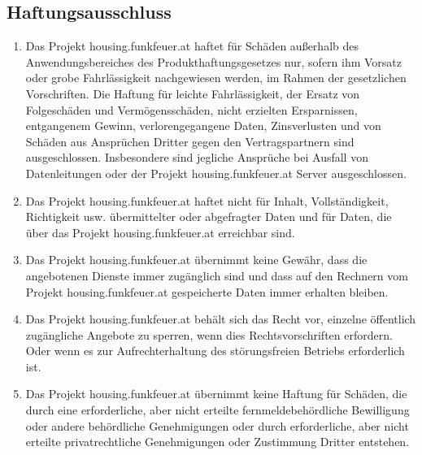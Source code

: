 \documentclass[parskip=half]{article}
\begin{document}
\subsection{ Haftungsausschluss}
\begin{enumerate}
\item Das Projekt housing.funkfeuer.at haftet für Schäden außerhalb des
Anwendungsbereiches des Produkthaftungsgesetzes nur, sofern ihm Vorsatz oder grobe
Fahrlässigkeit nachgewiesen werden, im Rahmen der gesetzlichen Vorschriften. Die
Haftung für leichte Fahrlässigkeit, der Ersatz von Folgeschäden und Vermögensschäden, nicht erzielten Ersparnissen, entgangenem Gewinn, verlorengegangene Daten, Zinsverlusten und
von Schäden aus Ansprüchen Dritter gegen den Vertragspartnern sind ausgeschlossen. Insbesondere sind jegliche Ansprüche bei Ausfall von Datenleitungen oder der Projekt housing.funkfeuer.at Server ausgeschlossen.
\item Das Projekt housing.funkfeuer.at haftet nicht für Inhalt, Vollständigkeit, Richtigkeit usw.
übermittelter oder abgefragter Daten und für Daten, die über das Projekt
housing.funkfeuer.at erreichbar sind.
\item Das Projekt housing.funkfeuer.at übernimmt keine Gewähr, dass die angebotenen
Dienste immer zugänglich sind und dass auf den Rechnern vom Projekt
housing.funkfeuer.at gespeicherte Daten immer erhalten bleiben.
\item Das Projekt housing.funkfeuer.at behält sich das Recht vor, einzelne öffentlich
zugängliche Angebote zu sperren, wenn dies Rechtsvorschriften erfordern. Oder wenn es
zur Aufrechterhaltung des störungsfreien Betriebs erforderlich ist.
\item Das Projekt housing.funkfeuer.at übernimmt keine Haftung für Schäden, die durch
eine erforderliche, aber nicht erteilte fernmeldebehördliche Bewilligung oder andere
behördliche Genehmigungen oder durch erforderliche, aber nicht erteilte privatrechtliche
Genehmigungen oder Zustimmung Dritter entstehen.
\end{enumerate}
\end{document}
